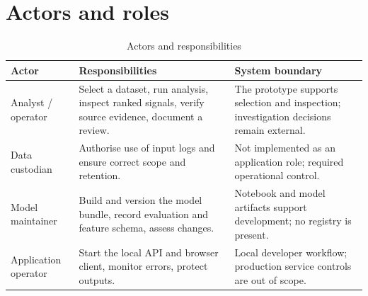 \documentclass[12pt,a4paper,oneside]{report}
\newcommand{\tablefont}{\small}
\begin{document}
\section{Actors and roles}
\begin{table}[H]
\centering
\tablefont
\caption{Actors and responsibilities}
\label{tab:actors}
\begin{tabularx}{\textwidth}{|p{}|p{}|Y|}
\hline
\textbf{Actor} & \textbf{Responsibilities} & \textbf{System boundary}\\\hline
Analyst / operator & Select a dataset, run analysis, inspect ranked signals, verify source evidence, document a review. & The prototype supports selection and inspection; investigation decisions remain external.\\\hline
Data custodian & Authorise use of input logs and ensure correct scope and retention. & Not implemented as an application role; required operational control.\\\hline
Model maintainer & Build and version the model bundle, record evaluation and feature schema, assess changes. & Notebook and model artifacts support development; no registry is present.\\\hline
Application operator & Start the local API and browser client, monitor errors, protect outputs. & Local developer workflow; production service controls are out of scope.\\\hline
\end{tabularx}
\end{table}
\end{document}
